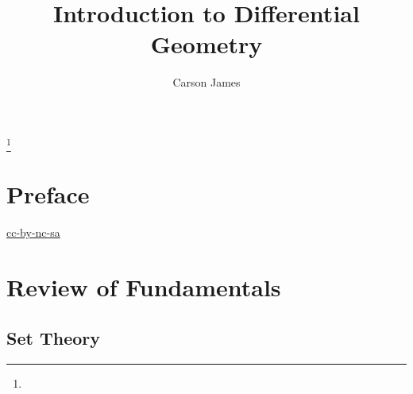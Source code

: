 \documentclass{book}
\begin{document}
	
	\frontmatter
	
	\title{Introduction to Differential Geometry}
	
	
	\author{Carson James}
	\thanks{}
	
	\date{}
	
	\maketitle
	
	
\setcounter{page}{4}
	
\tableofcontents
\printunsrtglossary[type=symbols,style=long,title={Notation}]
	
%
	
\mainmatter
%
	
\chapter*{Preface}
	
\begin{flushleft}
	\href{https://creativecommons.org/licenses/by-nc-sa/4.0/legalcode.txt}{cc-by-nc-sa}
\end{flushleft}
	
\newpage
	
	\chapter{Review of Fundamentals}

	\section{Set Theory}
	
\end{document}
